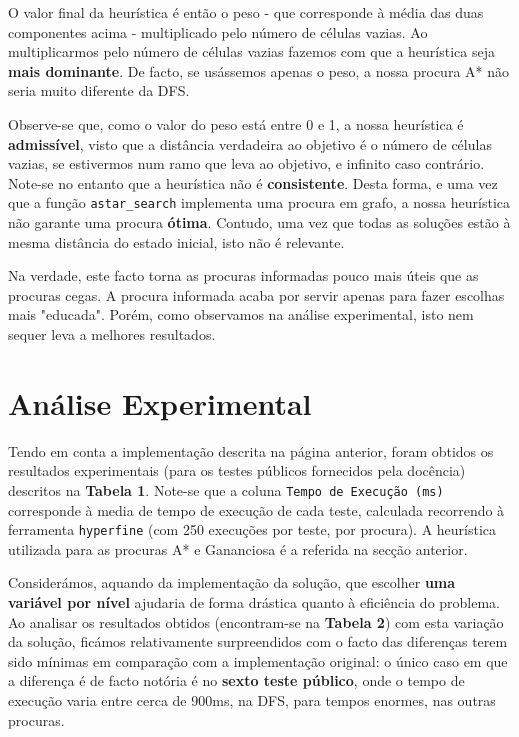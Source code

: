 \documentclass[12pt,a4paper]{article}
\begin{document}
O valor final da heurística é então o peso - que corresponde à média das duas componentes acima - multiplicado pelo número de células vazias.
Ao multiplicarmos pelo número de células vazias fazemos com que a heurística seja \textbf{mais dominante}.
De facto, se usássemos apenas o peso, a nossa procura A* não seria muito diferente da DFS.

Observe-se que, como o valor do peso está entre 0 e 1, a nossa heurística é \textbf{admissível}, visto que a distância verdadeira ao objetivo é o número de células vazias, se estivermos num ramo que leva ao objetivo, e infinito caso contrário.
Note-se no entanto que a heurística não é \textbf{consistente}.
Desta forma, e uma vez que a função \texttt{astar\_search} implementa uma procura em grafo, a nossa heurística não garante uma procura \textbf{ótima}.
Contudo, uma vez que todas as soluções estão à mesma distância do estado inicial, isto não é relevante.

Na verdade, este facto torna as procuras informadas pouco mais úteis que as procuras cegas.
A procura informada acaba por servir apenas para fazer escolhas mais "educada".
Porém, como observamos na análise experimental, isto nem sequer leva a melhores resultados.

\section*{Análise Experimental}

Tendo em conta a implementação descrita na página anterior, foram obtidos
os resultados experimentais (para os testes públicos fornecidos pela docência)
descritos na \textbf{Tabela 1}. Note-se que a coluna \texttt{Tempo de Execução (ms)}
corresponde à media de tempo de execução de cada teste, calculada recorrendo à ferramenta
\texttt{hyperfine} (com 250 execuções por teste, por procura). A heurística
utilizada para as procuras A* e Gananciosa é a referida na secção anterior.

Considerámos, aquando da implementação da solução, que escolher \textbf{uma variável por nível}
ajudaria de forma drástica quanto à eficiência do problema. Ao analisar os resultados
obtidos (encontram-se na \textbf{Tabela 2}) com esta variação da solução, ficámos
relativamente surpreendidos com o facto das diferenças terem sido mínimas em comparação
com a implementação original: o único caso em que a diferença é de facto notória
é no \textbf{sexto teste público}, onde o tempo de execução varia entre cerca de
900ms, na DFS, para tempos enormes, nas outras procuras.
\end{document}
